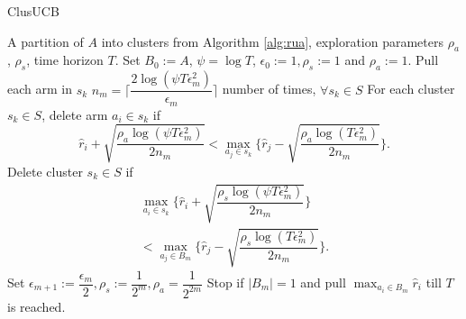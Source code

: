 \begin{algorithm}[t]
\caption{ClusUCB}
\label{alg:clusucb}
\begin{algorithmic}
 A partition of $A$ into clusters from Algorithm \ref{alg:rua}, exploration parameters $\rho_a$, $\rho_s$, time horizon $T$.
 Set $B_{0}:=A$, $\psi=\log T$, $\epsilon_{0}:=1,\rho_{s}:=1$ and $\rho_{a}:=1$.
\State Pull each arm in $s_{k}$ $n_{m}=\bigg\lceil\dfrac{2\log{(\psi T\epsilon_{m}^{2})}}{\epsilon_{m}}\bigg\rceil$ number of times, $\forall s_{k}\in S$ 
\ArmElim
\State For each cluster $s_k \in S$, delete arm $a_{i}\in s_{k}$ if
$$\hat{r}_{i} + \sqrt{\dfrac{\rho_{a}\log{(\psi T\epsilon_{m}^{2})}}{2 n_{m}}}  < \max_{a_{j}\in s_{k}}\bigg\lbrace\hat{r}_{j} -\sqrt{\dfrac{\rho_{a}\log{(T\epsilon_{m}^{2})}}{2 n_{m}}} \bigg\rbrace.$$
\EndArmElim
\ClusElim
\State Delete cluster $s_{k}\in S$ if 
\begin{align*}
 \max_{a_{i}\in s_{k}}\bigg\lbrace\hat{r}_{i} + \sqrt{\dfrac{\rho_{s}\log{(\psi T\epsilon_{m}^{2})}}{2 n_{m}}}\bigg\rbrace  \\
 < \max_{a_{j}\in B_{m}} \bigg\lbrace\hat{r}_{j} - \sqrt{\dfrac{\rho_{s} \log{(T\epsilon_{m}^{2})}}{2 n_{m}}}\bigg\rbrace.
\end{align*}
\EndClusElim
\State Set $\epsilon_{m+1}:=\dfrac{\epsilon_{m}}{2},\rho_{s}:=\dfrac{1}{2^{m}}, \rho_{a}=\dfrac{1}{2^{2m}}$
\State Stop if $|B_{m}|=1$ and pull $\max_{a_{i}\in B_{m}}\hat{r}_{i}$ till $T$ is reached.
\EndFor
\end{algorithmic}
\end{algorithm}

